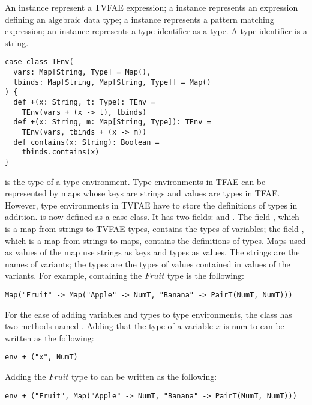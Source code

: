 An  instance represent a TVFAE expression; a  instance
represents
an expression defining an algebraic data type; a  instance represents
a
pattern matching expression; an  instance represents a type identifier
as a
type. A type identifier is a string.

\begin{verbatim}
case class TEnv(
  vars: Map[String, Type] = Map(),
  tbinds: Map[String, Map[String, Type]] = Map()
) {
  def +(x: String, t: Type): TEnv =
    TEnv(vars + (x -> t), tbinds)
  def +(x: String, m: Map[String, Type]): TEnv =
    TEnv(vars, tbinds + (x -> m))
  def contains(x: String): Boolean =
    tbinds.contains(x)
}
\end{verbatim}

 is the type of a type environment. Type environments in TFAE can be
represented by maps whose keys are strings and values are types in TFAE.
However, type environments in TVFAE have to store the definitions of types in
addition.  is now defined as a case class. It has two fields:
 and
. The field , which is a map from strings to TVFAE types,
contains
the types of variables; the field , which is a map from strings to
maps,
contains the definitions of types. Maps used as values of the map use strings as
keys and types as values. The strings are the names of variants; the types are
the types of values contained in values of the variants. For example,
containing the $Fruit$ type is the following:

\begin{verbatim}
Map("Fruit" -> Map("Apple" -> NumT, "Banana" -> PairT(NumT, NumT)))
\end{verbatim}

For the ease of adding variables and types to type environments, the 
class has two methods named \code{+}. Adding that the type of a variable $x$ is
$\textsf{num}$ to  can be written as the following:

\begin{verbatim}
env + ("x", NumT)
\end{verbatim}

Adding the $Fruit$ type to  can be written as the following:

\begin{verbatim}
env + ("Fruit", Map("Apple" -> NumT, "Banana" -> PairT(NumT, NumT)))
\end{verbatim}

